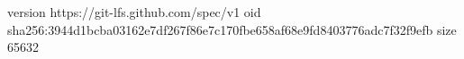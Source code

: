 version https://git-lfs.github.com/spec/v1
oid sha256:3944d1bcba03162e7df267f86e7c170fbe658af68e9fd8403776adc7f32f9efb
size 65632
